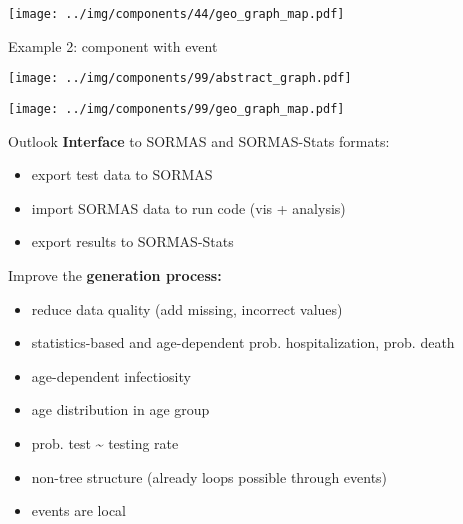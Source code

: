 \documentclass[
  8pt,
  ignorenonframetext,
]{beamer}
\providecommand{\tightlist}{%
  \setlength{\itemsep}{0pt}\setlength{\parskip}{0pt}}
\begin{document}
\begin{frame}
\begin{center}
\texttt{[image: ../img/components/44/geo\_graph\_map.pdf]}
\end{center}
\end{frame}

\begin{frame}{Example 2: component with event}
\protect\hypertarget{example-2-component-with-event}{}
\begin{center}
\texttt{[image: ../img/components/99/abstract\_graph.pdf]}
\end{center}
\end{frame}

\begin{frame}
\begin{center}
\texttt{[image: ../img/components/99/geo\_graph\_map.pdf]}
\end{center}
\end{frame}

\begin{frame}{Outlook}
\protect\hypertarget{outlook}{}
\textbf{Interface} to SORMAS and SORMAS-Stats formats:

\begin{itemize}
\tightlist
\item
  export test data to SORMAS
\item
  import SORMAS data to run code (vis + analysis)
\item
  export results to SORMAS-Stats
\end{itemize}
\end{frame}

\begin{frame}
Improve the \textbf{generation process:}

\begin{itemize}
\tightlist
\item
  reduce data quality (add missing, incorrect values)
\item
  statistics-based and age-dependent prob. hospitalization, prob. death
\item
  age-dependent infectiosity
\item
  age distribution in age group
\item
  prob. test \textasciitilde{} testing rate
\item
  non-tree structure (already loops possible through events)
\item
  events are local
\end{itemize}
\end{frame}
\end{document}
